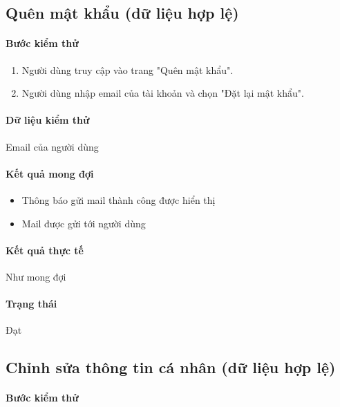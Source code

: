 \documentclass[./../main.tex]{subfiles}
\begin{document}
\subsection{Quên mật khẩu (dữ liệu hợp lệ)}

\paragraph*{Bước kiểm thử}

\begin{enumerate}
    \item Người dùng truy cập vào trang "Quên mật khẩu".
    \item Người dùng nhập email của tài khoản và chọn "Đặt lại mật khẩu".
\end{enumerate}

\paragraph*{Dữ liệu kiểm thử} Email của người dùng

\paragraph*{Kết quả mong đợi}

\begin{itemize}
    \item Thông báo gửi mail thành công được hiển thị
    \item Mail được gửi tới người dùng
\end{itemize}

\paragraph*{Kết quả thực tế} Như mong đợi

\paragraph*{Trạng thái} Đạt

\subsection{Chỉnh sửa thông tin cá nhân (dữ liệu hợp lệ)}

\paragraph*{Bước kiểm thử}
\end{document}
